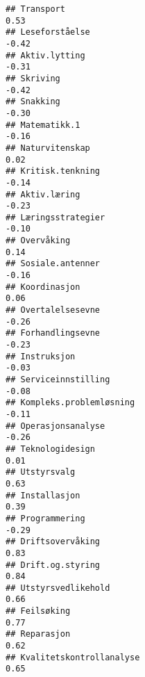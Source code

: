 \documentclass[
]{article}
\begin{document}
\begin{verbatim}
## Transport                                                                         0.53
## Leseforståelse                                                                   -0.42
## Aktiv.lytting                                                                    -0.31
## Skriving                                                                         -0.42
## Snakking                                                                         -0.30
## Matematikk.1                                                                     -0.16
## Naturvitenskap                                                                    0.02
## Kritisk.tenkning                                                                 -0.14
## Aktiv.læring                                                                     -0.23
## Læringsstrategier                                                                -0.10
## Overvåking                                                                        0.14
## Sosiale.antenner                                                                 -0.16
## Koordinasjon                                                                      0.06
## Overtalelsesevne                                                                 -0.26
## Forhandlingsevne                                                                 -0.23
## Instruksjon                                                                      -0.03
## Serviceinnstilling                                                               -0.08
## Kompleks.problemløsning                                                          -0.11
## Operasjonsanalyse                                                                -0.26
## Teknologidesign                                                                   0.01
## Utstyrsvalg                                                                       0.63
## Installasjon                                                                      0.39
## Programmering                                                                    -0.29
## Driftsovervåking                                                                  0.83
## Drift.og.styring                                                                  0.84
## Utstyrsvedlikehold                                                                0.66
## Feilsøking                                                                        0.77
## Reparasjon                                                                        0.62
## Kvalitetskontrollanalyse                                                          0.65

\end{verbatim}
\end{document}
